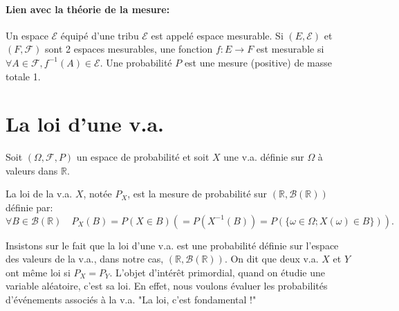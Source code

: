 \paragraph{Lien avec la théorie de la mesure:}
Un espace $\mathcal{E}$ équipé d'une tribu $\mathcal{E}$ est appelé espace mesurable. Si $(E, \mathcal{E})$ et $(F, \mathcal{F})$ sont 2 espaces mesurables, une fonction $f: E \to F$ est mesurable si $\forall A \in \mathcal{F}, f^{-1}(A) \in \mathcal{E}$. Une probabilité $P$ est une mesure (positive) de masse totale 1.
\section{La loi d'une v.a.}
Soit $(\Omega, \mathcal{F}, P)$ un espace de probabilité et soit $X$ une v.a. définie sur $\Omega$ à valeurs dans $\mathbb{R}$.

\begin{definition}
La loi de la v.a. $X$, notée $P_X$, est la mesure de probabilité sur $(\mathbb{R}, \mathcal{B}(\mathbb{R}))$ définie par:
\[ \forall B \in \mathcal{B}(\mathbb{R}) \quad P_X(B) = P(X \in B) (= P(X^{-1}(B)) = P(\{\omega \in \Omega; X(\omega) \in B\})). \]
\end{definition}

Insistons sur le fait que la loi d'une v.a. est une probabilité définie sur l'espace des valeurs de la v.a., dans notre cas, $(\mathbb{R}, \mathcal{B}(\mathbb{R}))$.
On dit que deux v.a. $X$ et $Y$ ont même loi si $P_X = P_Y$.
L'objet d'intérêt primordial, quand on étudie une variable aléatoire, c'est sa loi. En effet, nous voulons évaluer les probabilités d'événements associés à la v.a.
"La loi, c'est fondamental !"
